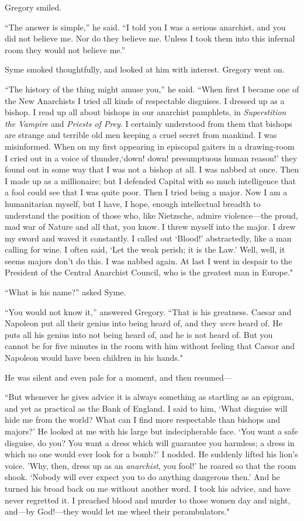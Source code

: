 \documentclass{book}
\begin{document}
Gregory smiled.

“The answer is simple,” he said. “I told you I was a serious anarchist, and you did not believe me. Nor do they believe me. Unless I took them into this infernal room they would not believe me.”

Syme smoked thoughtfully, and looked at him with interest. Gregory went on.

“The history of the thing might amuse you,” he said. “When first I became one of the New Anarchists I tried all kinds of respectable disguises. I dressed up as a bishop. I read up all about bishops in our anarchist pamphlets, in \emph{Superstition the Vampire} and \emph{Priests of Prey}. I certainly understood from them that bishops are strange and terrible old men keeping a cruel secret from mankind. I was misinformed. When on my first appearing in episcopal gaiters in a drawing-room I cried out in a voice of thunder,‘down! down! presumptuous human reason!’ they found out in some way that I was not a bishop at all. I was nabbed at once. Then I made up as a millionaire; but I defended Capital with so much intelligence that a fool could see that I was quite poor. Then I tried being a major. Now I am a humanitarian myself, but I have, I hope, enough intellectual breadth to understand the position of those who, like Nietzsche, admire violence—the proud, mad war of Nature and all that, you know. I threw myself into the major. I drew my sword and waved it constantly. I called out ‘Blood!’ abstractedly, like a man calling for wine. I often said, ‘Let the weak perish; it is the Law.’ Well, well, it seems majors don’t do this. I was nabbed again. At last I went in despair to the President of the Central Anarchist Council, who is the greatest man in Europe."

“What is his name?” asked Syme.

“You would not know it,” answered Gregory. “That is his greatness. Caesar and Napoleon put all their genius into being heard of, and they \emph{were} heard of. He puts all his genius into not being heard of, and he is not heard of. But you cannot be for five minutes in the room with him without feeling that Caesar and Napoleon would have been children in his hands."

He was silent and even pale for a moment, and then resumed—

“But whenever he gives advice it is always something as startling as an epigram, and yet as practical as the Bank of England. I said to him, ‘What disguise will hide me from the world? What can I find more respectable than bishops and majors?’ He looked at me with his large but indecipherable face. ‘You want a safe disguise, do you? You want a dress which will guarantee you harmless; a dress in which no one would ever look for a bomb?’ I nodded. He suddenly lifted his lion’s voice. ’Why, then, dress up as an \emph{anarchist}, you fool!’ he roared so that the room shook. ‘Nobody will ever expect you to do anything dangerous then.’ And he turned his broad back on me without another word. I took his advice, and have never regretted it. I preached blood and murder to those women day and night, and—by God!—they would let me wheel their perambulators."
\end{document}
